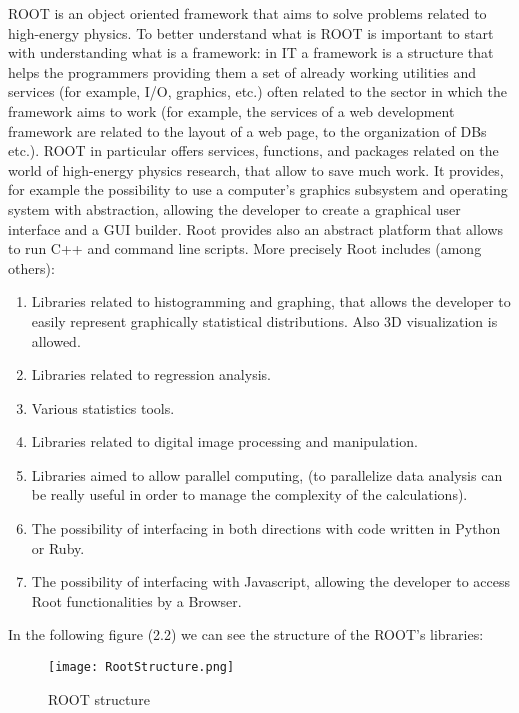 ROOT is an object oriented framework that aims to solve problems related to high-energy physics. To better understand what is ROOT is important to start with understanding what is a framework: in IT a framework is a structure that helps the programmers providing them a set of already working utilities and services (for example, I/O, graphics, etc.) often related to the sector in which the framework aims to work (for example, the services of a web development framework are related to the layout of a web page, to the organization of DBs etc.). ROOT in particular offers services, functions, and packages related on the world of high-energy physics research, that allow to save much work.
It provides, for example the possibility to use a computer's graphics subsystem and operating system with abstraction, allowing the developer to create a graphical user interface and a GUI builder. Root provides also an abstract platform that allows to run C++ and command line scripts. More precisely Root includes (among others):

\begin{enumerate}

\item Libraries related to histogramming and graphing, that allows the developer to easily represent graphically statistical distributions. Also 3D visualization is allowed.

\item Libraries related to regression analysis.

\item Various statistics tools. 

\item Libraries related to digital image processing and manipulation.

\item Libraries aimed to allow parallel computing, (to parallelize data analysis can be really useful in order to manage the complexity of the calculations).

\item The possibility of interfacing in both directions with code written in Python or Ruby.

\item The possibility of interfacing with Javascript, allowing the developer to access Root functionalities by a Browser.

\end{enumerate}

In the following figure (2.2) we can see the structure of the ROOT's libraries:

\begin{figure}[H]
\centering
\texttt{[image: RootStructure.png]} 
\caption{ROOT structure}
\end{figure}


